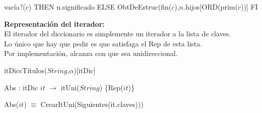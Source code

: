 {\IF vacía?($c$) THEN
	n.significado
ELSE		
   	ObtDeEstruc(fin($c$),$n$.hijos[ORD(prim($c$))]    
FI}

 \textbf{Representación del iterador:}\\ \tab
 El iterador del diccionario es simplemente un iterador a la lista de claves.\\\tab Lo único que hay que pedir es que satisfaga el Rep de esta lista.\\\tab Por implementación, alcanza con que sea unidireccional. 
 	\begin{Estructura}{itDiccTítulos($String$,$\alpha$)}[itDic]
    \begin{Tupla}[itDic]
    \end{Tupla}
 	\end{Estructura}

Abs : itDic $it$ $\longrightarrow$ itUni($String$) \hfill\{Rep($it$)\}\\ \hspace*{4mm}

Abs($it$) $\equiv$ CrearItUni(Siguientes(it.claves)))

